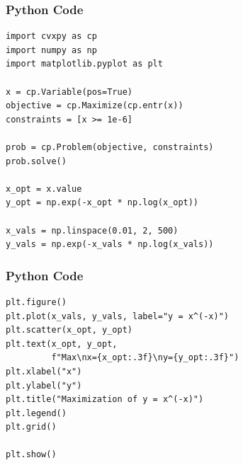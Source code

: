 \documentclass{beamer}
\begin{document}
\begin{frame}[fragile]
    \frametitle{Python Code}
    \begin{lstlisting}
import cvxpy as cp
import numpy as np
import matplotlib.pyplot as plt

x = cp.Variable(pos=True)
objective = cp.Maximize(cp.entr(x))
constraints = [x >= 1e-6]

prob = cp.Problem(objective, constraints)
prob.solve()

x_opt = x.value
y_opt = np.exp(-x_opt * np.log(x_opt))

x_vals = np.linspace(0.01, 2, 500)
y_vals = np.exp(-x_vals * np.log(x_vals))
    \end{lstlisting}
\end{frame}

\begin{frame}[fragile]
    \frametitle{Python Code}
    \begin{lstlisting}
plt.figure()
plt.plot(x_vals, y_vals, label="y = x^(-x)")
plt.scatter(x_opt, y_opt)
plt.text(x_opt, y_opt,
         f"Max\nx={x_opt:.3f}\ny={y_opt:.3f}")
plt.xlabel("x")
plt.ylabel("y")
plt.title("Maximization of y = x^(-x)")
plt.legend()
plt.grid()

plt.show()
    \end{lstlisting}
\end{frame}
\end{document}
